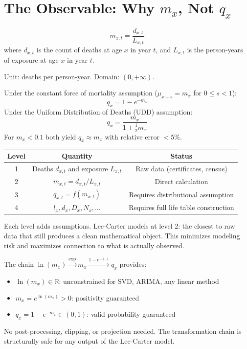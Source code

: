 \documentclass[11pt,a4paper]{article}
\begin{document}
\section{The Observable: Why $m_x$, Not $q_x$}

\begin{formaldef}
\[
m_{x,t} = \frac{d_{x,t}}{L_{x,t}}
\]
where $d_{x,t}$ is the count of deaths at age $x$ in year $t$, and $L_{x,t}$ is the person-years
of exposure at age $x$ in year $t$.

Unit: deaths per person-year. Domain: $(0, +\infty)$.
\end{formaldef}

\begin{formaldef}
Under the constant force of mortality assumption ($\mu_{x+s} = m_x$ for $0 \leq s < 1$):
\[
q_x = 1 - e^{-m_x}
\]
Under the Uniform Distribution of Deaths (UDD) assumption:
\[
q_x = \frac{m_x}{1 + \frac{1}{2} m_x}
\]
For $m_x < 0.1$ both yield $q_x \approx m_x$ with relative error $< 5\%$.
\end{formaldef}

\begin{intuition}
\begin{center}
\begin{tabular}{@{} c c c @{}}
\toprule
\textbf{Level} & \textbf{Quantity} & \textbf{Status} \\
\midrule
1 & Deaths $d_{x,t}$ and exposure $L_{x,t}$ & Raw data (certificates, census) \\
2 & $m_{x,t} = d_{x,t} / L_{x,t}$ & Direct calculation \\
3 & $q_{x,t} = f(m_{x,t})$ & Requires distributional assumption \\
4 & $l_x, d_x, D_x, N_x, \ldots$ & Requires full life table construction \\
\bottomrule
\end{tabular}
\end{center}
Each level adds assumptions. Lee-Carter models at level 2: the closest to raw data
that still produces a clean mathematical object. This minimizes modeling risk and
maximizes connection to what is actually observed.
\end{intuition}

\begin{application}
The chain $\ln(m_x) \xrightarrow{\exp} m_x \xrightarrow{1 - e^{-(\cdot)}} q_x$ provides:
\begin{itemize}[nosep]
  \item $\ln(m_x) \in \mathbb{R}$: unconstrained for SVD, ARIMA, any linear method
  \item $m_x = e^{\ln(m_x)} > 0$: positivity guaranteed
  \item $q_x = 1 - e^{-m_x} \in (0, 1)$: valid probability guaranteed
\end{itemize}
No post-processing, clipping, or projection needed. The transformation chain
is structurally safe for any output of the Lee-Carter model.
\end{application}
\end{document}

